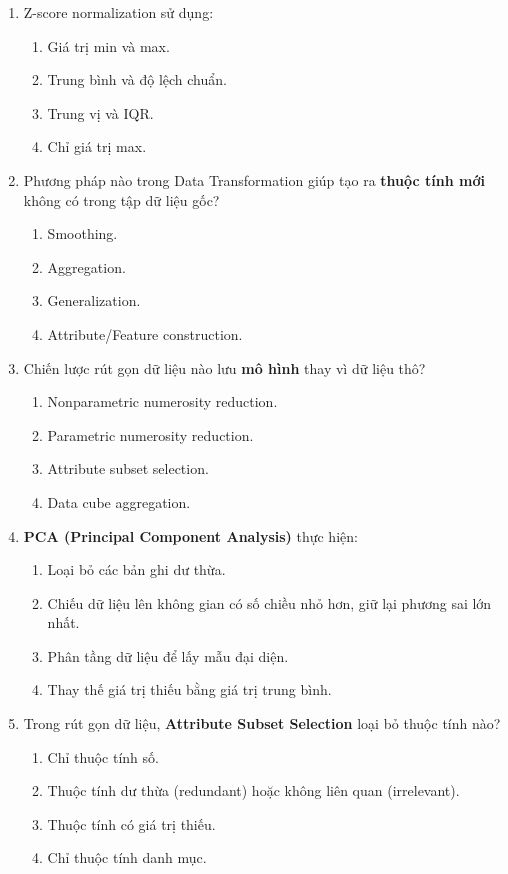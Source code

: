 \documentclass[10pt]{article}
\begin{document}
\begin{enumerate}[leftmargin=*, label=\textbf{Câu \arabic*.}]
    \item Z-score normalization sử dụng:
    \begin{enumerate}[label=\Alph*.]
        \item Giá trị min và max.
        \item Trung bình và độ lệch chuẩn.
        \item Trung vị và IQR.
        \item Chỉ giá trị max.
    \end{enumerate}

    \item Phương pháp nào trong Data Transformation giúp tạo ra \textbf{thuộc tính mới} không có trong tập dữ liệu gốc?
    \begin{enumerate}[label=\Alph*.]
        \item Smoothing.
        \item Aggregation.
        \item Generalization.
        \item Attribute/Feature construction.
    \end{enumerate}

    \item Chiến lược rút gọn dữ liệu nào lưu \textbf{mô hình} thay vì dữ liệu thô?
    \begin{enumerate}[label=\Alph*.]
        \item Nonparametric numerosity reduction.
        \item Parametric numerosity reduction.
        \item Attribute subset selection.
        \item Data cube aggregation.
    \end{enumerate}

    \item \textbf{PCA (Principal Component Analysis)} thực hiện:
    \begin{enumerate}[label=\Alph*.]
        \item Loại bỏ các bản ghi dư thừa.
        \item Chiếu dữ liệu lên không gian có số chiều nhỏ hơn, giữ lại phương sai lớn nhất.
        \item Phân tầng dữ liệu để lấy mẫu đại diện.
        \item Thay thế giá trị thiếu bằng giá trị trung bình.
    \end{enumerate}

    \item Trong rút gọn dữ liệu, \textbf{Attribute Subset Selection} loại bỏ thuộc tính nào?
    \begin{enumerate}[label=\Alph*.]
        \item Chỉ thuộc tính số.
        \item Thuộc tính dư thừa (redundant) hoặc không liên quan (irrelevant).
        \item Thuộc tính có giá trị thiếu.
        \item Chỉ thuộc tính danh mục.
    \end{enumerate}


\end{enumerate}
\end{document}
